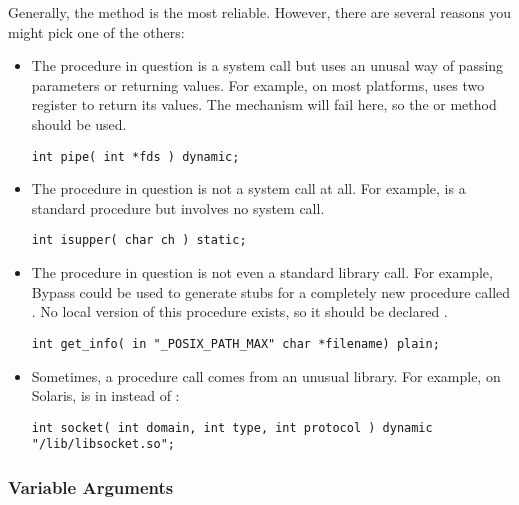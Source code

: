 Generally, the  method is the most reliable.  However, there are several reasons you might pick one of the others:
\begin{itemize}
\item The procedure in question is a system call but uses an unusal way of passing parameters or returning values.  For example, on most platforms,  uses two register to return its values.  The  mechanism will fail here, so the  or  method should be used.
\begin{verbatim}
int pipe( int *fds ) dynamic;
\end{verbatim}
\item The procedure in question is not a system call at all.  For example,  is a standard procedure but involves no system call.
\begin{verbatim}
int isupper( char ch ) static;
\end{verbatim}
\item The procedure in question is not even a standard library call.  For example, Bypass could be used to generate stubs for a completely new procedure called .  No local version of this procedure exists, so it should be declared .
\begin{verbatim}
int get_info( in "_POSIX_PATH_MAX" char *filename) plain;
\end{verbatim}
\item Sometimes, a procedure call comes from an unusual library.  For example, on Solaris,  is in  instead of :
\begin{verbatim}
int socket( int domain, int type, int protocol ) dynamic "/lib/libsocket.so";
\end{verbatim}
\end{itemize}


\subsubsection{Variable Arguments}

